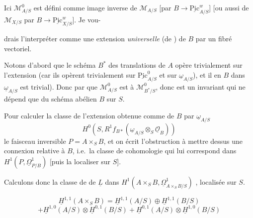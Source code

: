 \documentclass[11pt,a4paper]{article}
\begin{document}

Ici $\mathcal{M}^{0}_{A/S}$  est défini comme image inverse de $\mathcal{M}_{A/S}$ [par $B \to \underline{\mathrm{Pic}}^{w}_{A/S}$]  [ou aussi de $\mathcal{M}_{X/S}$ par $B \to \underline{\mathrm{Pic}}^{w}_{X/S}$]. Je vou-

drais l'interpréter comme une extension \emph{universelle} (de \ill{}) de $B$ par un fibré vectoriel.

Notons d'abord que le schéma $B^*$ des translations de $A$ opère trivialement sur l'extension   (car ils opèrent trivialement sur $\underline{\mathrm{Pic}}^{0}_{A/S}$ et sur $\underline{\omega}_{A/S}$), et il en   \ill{} $B$ dans $\underline{\omega}_{A/S}$ est trivial). Donc par  \ill{}   que $\mathcal{M}^{0}_{A/S}$ est   à $\mathcal{M}^{0}_{B^*/S}$, donc est un invariant qui ne dépend que du \struck{\ill{}} schéma abélien $B$ sur $S$.

Pour calculer la classe de l'extension obtenue comme \ill{} de $B$ par $\underline{\omega}_{A/S}$ \ill{}
\[
  H^0(S, R^1 f_{B*}(\underline{\omega}_{A/S} \otimes_S \underline{\mathcal{O}}_B))
\]
 le faisceau inversible   $P = A \times_S B$, et on écrit l'obstruction à mettre dessus une connexion relative à $B$, i.e.\ la classe de cohomologie qui lui correspond dans $H^1(P, \underline{\Omega}^1_{P/B})$ [puis la localiser sur $S$].

Calculons donc la classe de  de $\underline{L}$ dans $H^1(A \times_S B, \underline{\Omega}^1_{A \times_S B/S})$ \struck{\ill{}}, localisée sur $S$.

\[
  \underline{H}^{1,1}(A \times_S B) = \underline{H}^{1,1}(A/S) \oplus \underline{H}^{1,1}(B/S)
\]
\[
  + \underline{H}^{1,0}(A/S) \otimes \underline{H}^{0,1}(B/S) + \underline{H}^{0,1}(A/S) \otimes \underline{H}^{1,0}(B/S)
\]
\end{document}
